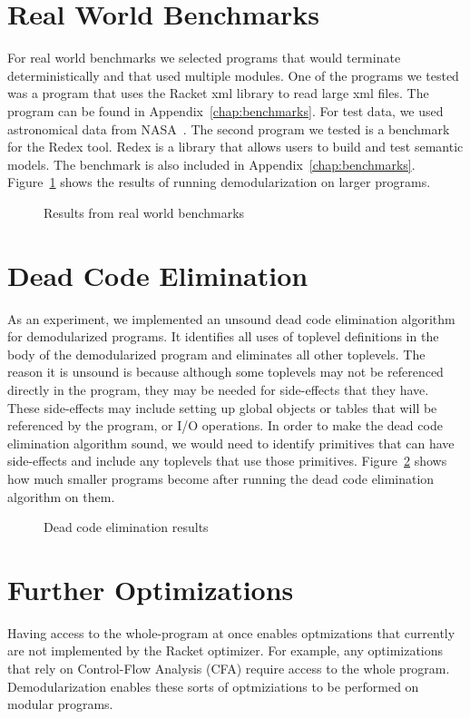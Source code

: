 \section{Real World Benchmarks}
For real world benchmarks we selected programs that would terminate deterministically and that used multiple modules.
One of the programs we tested was a program that uses the Racket xml library to read large xml files.
The program can be found in Appendix~\ref{chap:benchmarks}.
For test data, we used astronomical data from NASA~\cite{nasa}. 
The second program we tested is a benchmark for the Redex tool.
Redex is a library that allows users to build and test semantic models.
The benchmark is also included in Appendix~\ref{chap:benchmarks}.
Figure~\ref{fig:macro-results} shows the results of running demodularization on larger programs.
\begin{figure}
\caption{Results from real world benchmarks}
\label{fig:macro-results}
\end{figure}

\section{Dead Code Elimination}
As an experiment, we implemented an unsound dead code elimination algorithm for demodularized programs.
It identifies all uses of toplevel definitions in the body of the demodularized program and eliminates all other toplevels.
The reason it is unsound is because although some toplevels may not be referenced directly in the program, they may be needed for side-effects that they have.
These side-effects may include setting up global objects or tables that will be referenced by the program, or I/O operations.
In order to make the dead code elimination algorithm sound, we would need to identify primitives that can have side-effects and include any toplevels that use those primitives.
Figure~\ref{fig:dead-code} shows how much smaller programs become after running the dead code elimination algorithm on them.
\begin{figure}
\caption{Dead code elimination results}
\label{fig:dead-code}
\end{figure}

\section{Further Optimizations}

Having access to the whole-program at once enables optmizations that currently are not implemented by the Racket optimizer.
For example, any optimizations that rely on Control-Flow Analysis (CFA) require access to the whole program.
Demodularization enables these sorts of optmiziations to be performed on modular programs.

